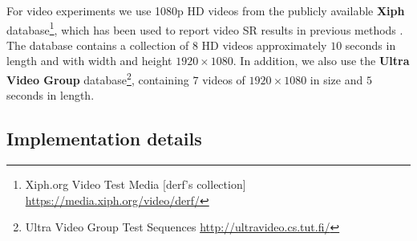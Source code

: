 \documentclass[10pt,twocolumn,letterpaper]{article}
\begin{document}
For video experiments we use 1080p HD videos from the publicly available \textbf{Xiph} database\footnote{Xiph.org Video Test Media [derf's collection] \url{https://media.xiph.org/video/derf/}}, which has been used to report video \ac{SR} results in previous methods \cite{Takeda2009, liu2011bayesian}. The database contains a collection of $8$ \ac{HD} videos approximately $10$ seconds in length and with width and height $1920 \times 1080$. In addition, we also use the \textbf{Ultra Video Group} database\footnote{Ultra Video Group Test Sequences \url{http://ultravideo.cs.tut.fi/}}, containing $7$ videos of $1920 \times 1080$ in size and $5$ seconds in length.

\subsection{Implementation details}
\end{document}
